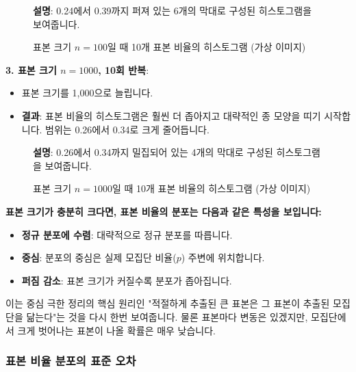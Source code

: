 \documentclass[11pt,a4paper]{article}
\theoremstyle{definition}
\begin{document}
\begin{examplebox}
\begin{figure}[h!]
    \centering
    \caption{표본 크기 $n=100$일 때 10개 표본 비율의 히스토그램 (가상 이미지)}
    \label{fig:hist_prop_n100}
    \textbf{설명}: 0.24에서 0.39까지 퍼져 있는 6개의 막대로 구성된 히스토그램을 보여줍니다.
\end{figure}

\textbf{3. 표본 크기 $n=1000$, 10회 반복}:
\begin{itemize}
    \item 표본 크기를 1,000으로 늘립니다.
    \item \textbf{결과}: 표본 비율의 히스토그램은 훨씬 더 좁아지고 대략적인 종 모양을 띠기 시작합니다. 범위는 0.26에서 0.34로 크게 줄어듭니다.
\end{itemize}

\begin{figure}[h!]
    \centering
    \caption{표본 크기 $n=1000$일 때 10개 표본 비율의 히스토그램 (가상 이미지)}
    \label{fig:hist_prop_n1000}
    \textbf{설명}: 0.26에서 0.34까지 밀집되어 있는 4개의 막대로 구성된 히스토그램을 보여줍니다.
\end{figure}
\end{examplebox}

\begin{summarybox}
\textbf{표본 크기가 충분히 크다면, 표본 비율의 분포는 다음과 같은 특성을 보입니다:}
\begin{itemize}
    \item \textbf{정규 분포에 수렴}: 대략적으로 정규 분포를 따릅니다.
    \item \textbf{중심}: 분포의 중심은 실제 모집단 비율($p$) 주변에 위치합니다.
    \item \textbf{퍼짐 감소}: 표본 크기가 커질수록 분포가 좁아집니다.
\end{itemize}
이는 중심 극한 정리의 핵심 원리인 "적절하게 추출된 큰 표본은 그 표본이 추출된 모집단을 닮는다"는 것을 다시 한번 보여줍니다. 물론 표본마다 변동은 있겠지만, 모집단에서 크게 벗어나는 표본이 나올 확률은 매우 낮습니다.
\end{summarybox}

\subsubsection*{표본 비율 분포의 표준 오차}
\end{document}
